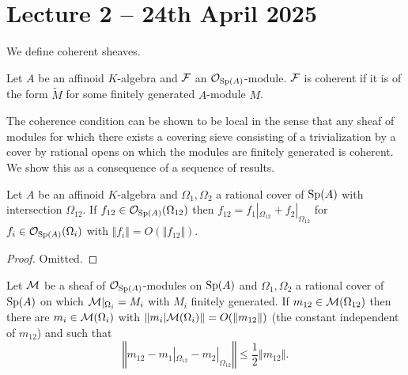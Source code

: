 \section{Lecture 2 -- 24th April 2025}\label{sec: lecture 2}
We define coherent sheaves. 
\begin{definition}\label{def: coherent sheaves}
    Let $A$ be an affinoid $K$-algebra and $\mathcal{F}$ an $\mathcal{O}_{\mathrm{Sp}(A)}$-module. $\mathcal{F}$ is coherent if it is of the form $\widetilde{M}$ for some finitely generated $A$-module $M$. 
\end{definition}
The coherence condition can be shown to be local in the sense that any sheaf of modules for which there exists a covering sieve consisting of a trivialization by a cover by rational opens on which the modules are finitely generated is coherent. We show this as a consequence of a sequence of results. 
\begin{proposition}\label{prop: asymptotic sections of structure sheaf}
  Let $A$ be an affinoid $K$-algebra and $\Omega_{1},\Omega_{2}$ a rational cover of $\mathrm{Sp}(A)$ with intersection $\Omega_{12}$. If $f_{12}\in\mathcal{O}_{\mathrm{Sp}(A)}(\Omega_{12})$ then $f_{12}=f_{1}|_{\Omega_{12}}+f_{2}|_{\Omega_{12}}$ for $f_{i}\in\mathcal{O}_{\mathrm{Sp}(A)}(\Omega_{i})$ with $\Vert f_{i}\Vert=O(\Vert f_{12}\Vert)$. 
\end{proposition}
\begin{proof}
    Omitted. 
\end{proof}
\begin{lemma}\label{lem: weak bound for double intersection elements}
    Let $\mathcal{M}$ be a sheaf of $\mathcal{O}_{\mathrm{Sp}(A)}$-modules on $\mathrm{Sp}(A)$ and $\Omega_{1},\Omega_{2}$ a rational cover of $\mathrm{Sp}(A)$ on which $\mathcal{M}|_{\Omega_{i}}=M_{i}$ with $M_{i}$ finitely generated. If $m_{12}\in\mathcal{M}(\Omega_{12})$ then there are $m_{i}\in\mathcal{M}(\Omega_{i})$ with $\Vert m_{i}|\mathcal{M}(\Omega_{i})\Vert=O(\Vert m_{12}\Vert)$ (the constant independent of $m_{12}$) and such that 
    $$\left\Vert m_{12}-m_{1}|_{\Omega_{12}}-m_{2}|_{\Omega_{12}}\right\Vert\leq\frac{1}{2}\left\Vert m_{12}\right\Vert.$$
\end{lemma}

